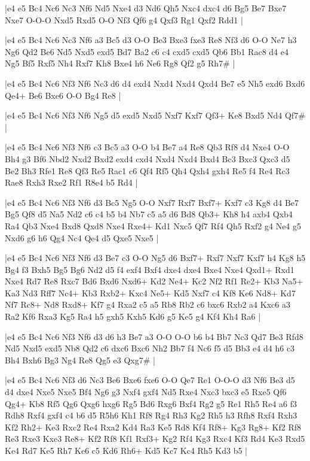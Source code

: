 \whitename{}
\blackname{}
\makegametitle
|e4 e5 Bc4 Nc6 Nc3 Nf6 Nd5 Nxe4 d3 Nd6 Qh5 Nxc4 dxc4 d6 Bg5 Be7 Bxe7 Nxe7 O-O-O Nxd5 Rxd5 O-O Nf3 Qf6 g4 Qxf3 Rg1 Qxf2 Rdd1  |

\whitename{}
\blackname{}
\makegametitle
|e4 e5 Bc4 Nc6 Nc3 Nf6 a3 Bc5 d3 O-O Be3 Bxe3 fxe3 Re8 Nf3 d6 O-O Ne7 h3 Ng6 Qd2 Be6 Nd5 Nxd5 exd5 Bd7 Ba2 c6 c4 cxd5 cxd5 Qb6 Bb1 Rac8 d4 e4 Ng5 Bf5 Rxf5 Nh4 Rxf7 Kh8 Bxe4 h6 Ne6 Rg8 Qf2 g5 Rh7\#  |

\whitename{}
\blackname{}
\makegametitle
|e4 e5 Bc4 Nc6 Nf3 Nf6 Nc3 d6 d4 exd4 Nxd4 Nxd4 Qxd4 Be7 e5 Nh5 exd6 Bxd6 Qe4+ Be6 Bxe6 O-O Bg4 Re8  |

\whitename{}
\blackname{}
\makegametitle
|e4 e5 Bc4 Nc6 Nf3 Nf6 Ng5 d5 exd5 Nxd5 Nxf7 Kxf7 Qf3+ Ke8 Bxd5 Nd4 Qf7\#  |

\whitename{}
\blackname{}
\makegametitle
|e4 e5 Bc4 Nc6 Nf3 Nf6 c3 Bc5 a3 O-O b4 Be7 a4 Re8 Qb3 Rf8 d4 Nxe4 O-O Bh4 g3 Bf6 Nbd2 Nxd2 Bxd2 exd4 cxd4 Nxd4 Nxd4 Bxd4 Bc3 Bxc3 Qxc3 d5 Be2 Bh3 Rfe1 Re8 Qf3 Re5 Rac1 c6 Qf4 Rf5 Qh4 Qxh4 gxh4 Re5 f4 Re4 Rc3 Rae8 Rxh3 Rxe2 Rf1 R8e4 b5 Rd4  |

\whitename{}
\blackname{}
\makegametitle
|e4 e5 Bc4 Nc6 Nf3 Nf6 d3 Bc5 Ng5 O-O Nxf7 Rxf7 Bxf7+ Kxf7 c3 Kg8 d4 Be7 Bg5 Qf8 d5 Na5 Nd2 c6 c4 b5 b4 Nb7 c5 a5 d6 Bd8 Qb3+ Kh8 h4 axb4 Qxb4 Ra4 Qb3 Nxe4 Bxd8 Qxd8 Nxe4 Rxe4+ Kd1 Nxc5 Qf7 Rf4 Qh5 Rxf2 g4 Ne4 g5 Nxd6 g6 h6 Qg4 Nc4 Qe4 d5 Qxe5 Nxe5  |

\whitename{}
\blackname{}
\makegametitle
|e4 e5 Bc4 Nc6 Nf3 Nf6 d3 Be7 c3 O-O Ng5 d6 Bxf7+ Rxf7 Nxf7 Kxf7 h4 Kg8 h5 Bg4 f3 Bxh5 Bg5 Bg6 Nd2 d5 f4 exf4 Bxf4 dxe4 dxe4 Bxe4 Nxe4 Qxd1+ Rxd1 Nxe4 Rd7 Re8 Rxc7 Bd6 Bxd6 Nxd6+ Kd2 Ne4+ Kc2 Nf2 Rf1 Re2+ Kb3 Na5+ Ka3 Nd3 Rff7 Nc4+ Kb3 Rxb2+ Kxc4 Ne5+ Kd5 Nxf7 c4 Kf8 Ke6 Nd8+ Kd7 Nf7 Rc8+ Nd8 Rxd8+ Kf7 g4 Rxa2 c5 a5 Rb8 Rb2 c6 bxc6 Rxb2 a4 Kxc6 a3 Ra2 Kf6 Rxa3 Kg5 Ra4 h5 gxh5 Kxh5 Kd6 g5 Ke5 g4 Kf4 Kh4 Ra6  |

\whitename{}
\blackname{}
\makegametitle
|e4 e5 Bc4 Nc6 Nf3 Nf6 d3 d6 h3 Be7 a3 O-O O-O b6 b4 Bb7 Nc3 Qd7 Be3 Rfd8 Nd5 Nxd5 exd5 Nb8 Qd2 c6 dxc6 Bxc6 Nh2 Bb7 f4 Nc6 f5 d5 Bb3 e4 d4 h6 c3 Bh4 Bxh6 Bg3 Ng4 Re8 Qg5 e3 Qxg7\#  |

\whitename{}
\blackname{}
\makegametitle
|e4 e5 Bc4 Nc6 Nf3 d6 Nc3 Be6 Bxe6 fxe6 O-O Qe7 Re1 O-O-O d3 Nf6 Be3 d5 d4 dxe4 Nxe5 Nxe5 Bf4 Ng6 g3 Nxf4 gxf4 Nd5 Rxe4 Nxc3 bxc3 e5 Rxe5 Qf6 Qg4+ Kb8 Rf5 Qg6 Qxg6 hxg6 Rg5 Bd6 Rxg6 Bxf4 Rg2 g5 Re1 Rh5 Re4 a6 f3 Rdh8 Rxf4 gxf4 c4 b6 d5 R5h6 Kh1 Rf8 Rg4 Rh3 Kg2 Rh5 h3 Rfh8 Rxf4 Rxh3 Kf2 Rh2+ Ke3 Rxc2 Re4 Rxa2 Kd4 Ra3 Ke5 Rd8 Kf4 Rf8+ Kg3 Rg8+ Kf2 Rf8 Re3 Rxe3 Kxe3 Re8+ Kf2 Rf8 Kf1 Rxf3+ Kg2 Rf4 Kg3 Rxc4 Kf3 Rd4 Ke3 Rxd5 Ke4 Rd7 Ke5 Rh7 Ke6 c5 Kd6 Rh6+ Kd5 Kc7 Kc4 Rh5 Kd3 b5  |

